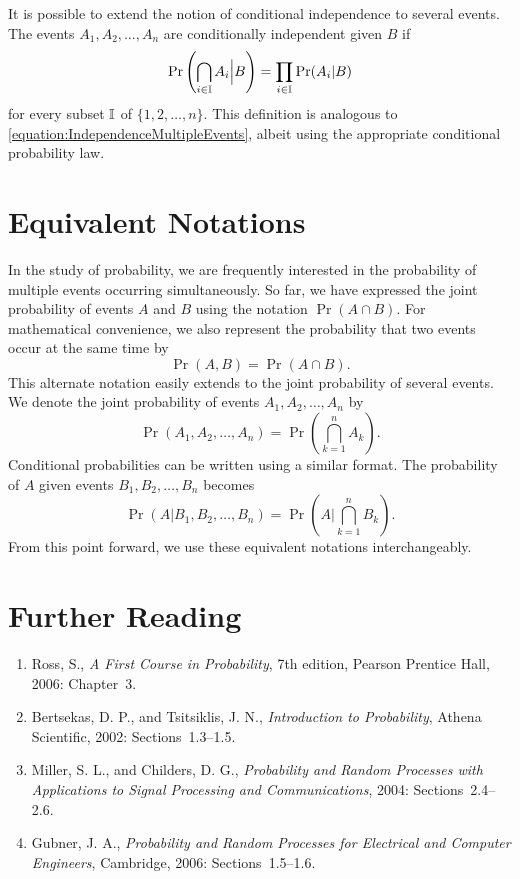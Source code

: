 It is possible to extend the notion of conditional independence to several events.
The events $A_1, A_2, \ldots, A_n$ are conditionally independent given $B$ if
\begin{equation*}
\Pr \left( \bigcap_{i \in \mathbb{I}} A_i \Big| B \right)
= \prod_{i \in \mathbb{I}} \Pr (A_i | B)
\end{equation*}
for every subset $\mathbb{I}$ of $\{1, 2, \ldots, n\}$.
This definition is analogous to \eqref{equation:IndependenceMultipleEvents}, albeit using the appropriate conditional probability law.


\section{Equivalent Notations}

In the study of probability, we are frequently interested in the probability of multiple events occurring simultaneously.
So far, we have expressed the joint probability of events $A$ and $B$ using the notation $\Pr (A \cap B)$.
For mathematical convenience, we also represent the probability that two events occur at the same time by
\begin{equation*}
\Pr (A, B) = \Pr (A \cap B) .
\end{equation*}
This alternate notation easily extends to the joint probability of several events.
We denote the joint probability of events $A_1, A_2, \ldots, A_n$ by
\begin{equation*}
\Pr (A_1, A_2, \ldots, A_n) =
\Pr \left( \bigcap_{k=1}^n A_k \right) .
\end{equation*}
Conditional probabilities can be written using a similar format.
The probability of $A$ given events $B_1, B_2, \ldots, B_n$ becomes
\begin{equation*}
\Pr (A | B_1, B_2, \ldots, B_n) =
\Pr \left( A \bigg| \bigcap_{k=1}^n B_k \right) .
\end{equation*}
From this point forward, we use these equivalent notations interchangeably.


\section*{Further Reading}

\begin{small}
\begin{enumerate}
\item Ross, S., \emph{A First Course in Probability}, 7th edition, Pearson Prentice Hall, 2006: Chapter~3.
\item Bertsekas, D. P., and Tsitsiklis, J. N., \emph{Introduction to Probability}, Athena Scientific, 2002: Sections~1.3--1.5.
\item Miller, S. L., and Childers, D. G., \emph{Probability and Random Processes with Applications to Signal Processing and Communications}, 2004: Sections~2.4--2.6.
\item Gubner, J. A., \emph{Probability and Random Processes for Electrical and Computer Engineers}, Cambridge, 2006: Sections~1.5--1.6.
\end{enumerate}
\end{small}

